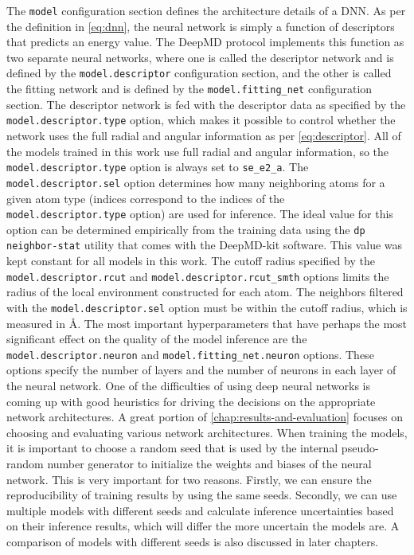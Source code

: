 The \texttt{model} configuration section defines the architecture details of
a DNN. As per the definition in \eqref{eq:dnn}, the neural network is simply a
function of descriptors that predicts an energy value. The DeepMD
protocol implements this function as two separate neural networks,
where one is called the descriptor network and is defined by the
\texttt{model.descriptor} configuration section, and the other is called the
fitting network and is defined by the \texttt{model.fitting\_net}
configuration section. The descriptor network is fed with the descriptor data
as specified by the \texttt{model.descriptor.type} option, which makes it
possible to control whether the network uses the full radial and angular
information as per \eqref{eq:descriptor}. All of the models trained in this
work use full radial and angular information, so the
\texttt{model.descriptor.type} option is always set to \texttt{se\_e2\_a}.
The \texttt{model.descriptor.sel} option determines how many neighboring atoms
for a given atom type (indices correspond to the indices of the
\texttt{model.descriptor.type} option) are used for inference. The ideal value
for this option can be determined empirically from the training data using the
\texttt{dp neighbor-stat} utility that comes with the DeepMD-kit software.
This value was kept constant for all models in this work. The cutoff radius
specified by the \texttt{model.descriptor.rcut} and
\texttt{model.descriptor.rcut\_smth} options limits the radius of the local
environment constructed for each atom. The neighbors filtered with the
\texttt{model.descriptor.sel} option must be within the cutoff radius, which
is measured in \AA. The most important hyperparameters that have perhaps the
most significant effect on the quality of the model inference are
the \texttt{model.descriptor.neuron} and \texttt{model.fitting\_net.neuron}
options. These options specify the number of layers and the number of neurons
in each layer of the neural network. One of the difficulties of using deep neural
networks is coming up with good heuristics for driving the decisions on the
appropriate network architectures. A great portion of
\autoref{chap:results-and-evaluation} focuses on choosing and evaluating
various network architectures. When training the models, it is important to
choose a random seed that is used by the internal pseudo-random number
generator to initialize the weights and biases of the neural network. This is
very important for two reasons. Firstly, we can ensure the reproducibility of
training results by using the same seeds. Secondly, we can use multiple
models with different seeds and calculate inference uncertainties based on
their inference results, which will differ the more uncertain the models
are. A comparison of models with different seeds is also discussed in later
chapters.


